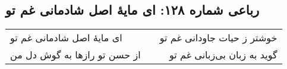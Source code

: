 \begin{center}
\section*{رباعی شماره ۱۲۸: ای مایهٔ اصل شادمانی غم تو}
\label{sec:128}
\begin{longtable}{l p{0.5cm} r}
ای مایهٔ اصل شادمانی غم تو
&&
خوشتر ز حیات جاودانی غم تو
\\
از حسن تو رازها به گوش دل من
&&
گوید به زبان بی‌زبانی غم تو
\\
\end{longtable}
\end{center}
